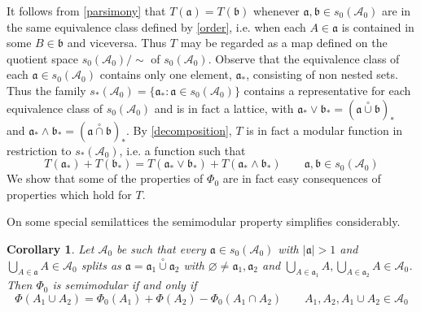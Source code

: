\documentclass[11pt]{amsart}
\theoremstyle{plain}
\newtheorem{corollary}{Corollary}
\begin{document}
It follows from \eqref{parsimony} that $T({\mathfrak a})=T({\mathfrak b})$ whenever 
${\mathfrak a},{\mathfrak b}\in s_0({\mathscr{A}}_0)$ are in the same equivalence class defined by \eqref{order},
i.e. when each $A\in{\mathfrak a}$ is contained in some $B\in{\mathfrak b}$ and viceversa. Thus 
$T$ may be regarded as a map defined on the quotient space 
$s_0({\mathscr{A}}_0)\slash\sim$ of $s_0({\mathscr{A}}_0)$. Observe that the equivalence class of
each ${\mathfrak a}\in s_0({\mathscr{A}}_0)$ contains only one element, ${\mathfrak a}_*$, consisting of non 
nested sets. Thus the family $s_*({\mathscr{A}}_0)=\{{\mathfrak a}_*:{\mathfrak a}\in s_0({\mathscr{A}}_0)\}$ contains a 
representative for each equivalence class of $s_0({\mathscr{A}}_0)$ and is in fact a lattice,
with ${\mathfrak a}_*\vee{\mathfrak b}_*=({\mathfrak a}{\overset\circ\cup}{\mathfrak b})_*$ and ${\mathfrak a}_*\wedge{\mathfrak b}_*=({\mathfrak a}{\overset\circ\cap}{\mathfrak b})_*$. 
By \eqref{decomposition}, $T$ is in fact a modular function in restriction to 
$s_*({\mathscr{A}}_0)$, i.e. a function such that
\begin{equation}
\label{T modular}
T({\mathfrak a}_*)+T({\mathfrak b}_*)=T({\mathfrak a}_*\vee{\mathfrak b}_*)+T({\mathfrak a}_*\wedge{\mathfrak b}_*)
\qquad {\mathfrak a},{\mathfrak b}\in s_0({\mathscr{A}}_0)
\end{equation}
We show that some of the properties of $\Phi_0$ are in fact easy consequences of 
properties which hold for $T$.

On some special semilattices the semimodular property simplifies considerably.

\begin{corollary}
\label{cor groemer}
Let ${\mathscr{A}}_0$ be such that every ${\mathfrak a}\in s_0({\mathscr{A}}_0)$ with ${\vert {\mathfrak a}\vert}>1$ and 
$\bigcup_{A\in{\mathfrak a}}A\in{\mathscr{A}}_0$ splits as ${\mathfrak a}={\mathfrak a}_1{\overset\circ\cup}{\mathfrak a}_2$ with ${\varnothing}\ne{\mathfrak a}_1,{\mathfrak a}_2$ 
and $\bigcup_{A\in{\mathfrak a}_1}A,\bigcup_{A\in{\mathfrak a}_2}A\in{\mathscr{A}}_0$. Then $\Phi_0$ is semimodular 
if and only if
\begin{equation}
\label{2 additive}
\Phi(A_1\cup A_2)=\Phi_0(A_1)+\Phi(A_2)-\Phi_0(A_1\cap A_2)
\qquad
A_1,A_2,A_1\cup A_2\in{\mathscr{A}}_0
\end{equation}
\end{corollary}
\end{document}
